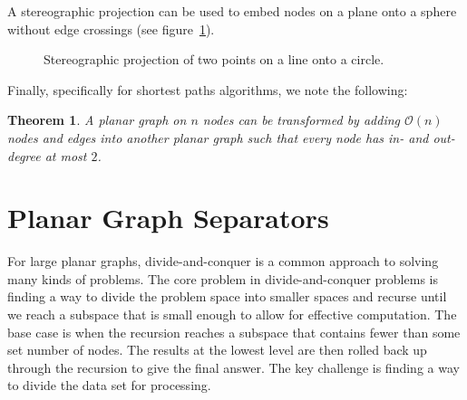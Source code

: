 \documentclass[11pt]{article}
\newtheorem{theorem}{Theorem}[section]
\begin{document}
A stereographic projection can be used to embed nodes on a plane onto a sphere without edge crossings (see figure~\ref{fig:stereo}).

\begin{figure}[!htb]
  \centering
  \caption{Stereographic projection of two points on a line onto a circle.}
  \label{fig:stereo}
\end{figure}

Finally, specifically for shortest paths algorithms, we note the following:\\

\begin{theorem}
  A planar graph on $n$ nodes can be transformed by adding $\mathcal{O}(n)$ nodes and edges into another planar graph such that every node has in- and out-degree at most $2$.
\end{theorem}

\section{Planar Graph Separators}
\label{sec:graph-sep}


For large planar graphs, divide-and-conquer is a common approach to solving many kinds of problems. The core problem in divide-and-conquer problems is finding a way to divide the problem space into smaller spaces and recurse until we reach a subspace that is small enough to allow for effective computation. The base case is when the recursion reaches a subspace that contains fewer than some set number of nodes. The results at the lowest level are then rolled back up through the recursion to give the final answer. The key challenge is finding a way to divide the data set for processing.
\end{document}

